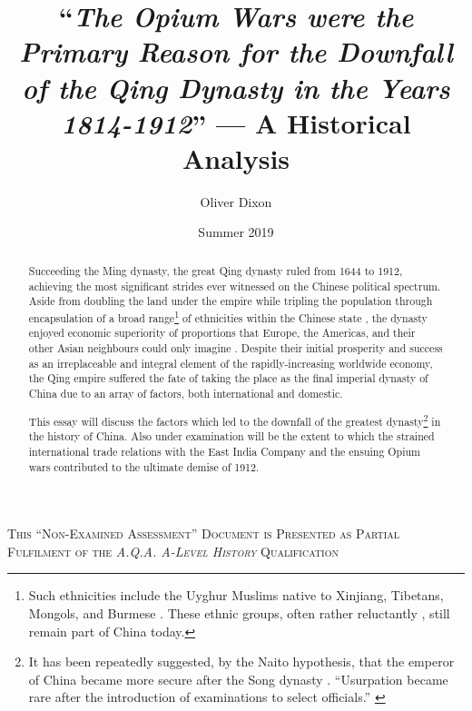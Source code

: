 \documentclass{article}
\title{``\emph{The Opium Wars were the Primary Reason for the Downfall of the Qing Dynasty in the Years 1814-1912}'' --- A Historical Analysis}
\author{Oliver Dixon}
\date{Summer 2019}
\newcommand{\textrule}{\noindent\makebox[\linewidth]{\rule{\linewidth}{0.4pt}}}
\begin{document}
\clearpage\maketitle
\thispagestyle{titlehdr}
\pagestyle{stdhdr}

\vspace*{-1.5em}
\begin{figure}[h!]
	\centering
	\def\svgwidth{0.5\linewidth}
	
\end{figure}
\vspace*{-0.5em}

\begin{abstract}

	Succeeding the Ming dynasty, the great Qing dynasty ruled from 1644 to 1912, achieving the most significant strides ever witnessed on the Chinese political spectrum. Aside from doubling the land under the empire
	\autocite{Turchin:2006} while tripling the population through encapsulation of a broad range\footnote{Such ethnicities include the Uyghur Muslims native to Xinjiang, Tibetans, Mongols, and Burmese
	\autocite{Chia:1993}. These ethnic groups, often rather reluctantly
	\autocites{Teichman:2002}{Smith:2009}{Dwyer:2005}, still remain part of China today.} of ethnicities within the Chinese state
	\autocite{Rowe:2012}, the dynasty enjoyed economic superiority of proportions that Europe, the Americas, and their other Asian neighbours could only imagine 
	\autocite{Maddison:2007}. Despite their initial prosperity and success as an irreplaceable and integral element of the rapidly-increasing worldwide economy, the Qing empire suffered the fate of taking the place as the final imperial dynasty of China due to an array of factors, both international and domestic.

	This essay will discuss the factors which led to the downfall of the greatest dynasty\footnote{It has been repeatedly suggested, by the Naito hypothesis, that the emperor of China became more secure after the Song dynasty
	\autocite{Miyakawa:1955}. ``Usurpation became rare after the introduction of examinations to select officials.''
	\autocite{Sng:2014}} in the history of China. Also under examination will be the extent to which the strained international trade relations with the East India Company and the ensuing Opium wars contributed to the ultimate demise of 1912.

\end{abstract}

\textrule
\vspace*{0.6em}
{\centering \textsc{This ``Non-Examined Assessment'' Document is Presented as Partial Fulfilment of the \textit{A.Q.A. A-Level History} Qualification}\\}
\textrule
\end{document}
